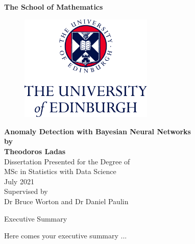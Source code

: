 \documentclass[11pt,twoside]{article}
\numberwithin{Theorem}{section}
\numberwithin{Definition}{section}
\numberwithin{Lemma}{section}
\numberwithin{Algorithm}{section}
\numberwithin{equation}{section}
\begin{document}
\pagestyle{empty}

\begin{titlepage}
\vspace*{.5em}
\center
\textbf{\Large{The School of Mathematics}} \\
\vspace*{1em}
\begin{figure}[!h]
\centering
\includegraphics[width=180pt]{CentredLogoCMYK.jpg}
\end{figure}
\vspace{2em}
\textbf{\Huge{Anomaly Detection with Bayesian Neural Networks}}\\[2em]
\textbf{\LARGE{by}}\\
\vspace{2em}
\textbf{\LARGE{Theodoros Ladas}}\\
\vspace{6.5em}
\Large{Dissertation Presented for the Degree of\\
MSc in Statistics with Data Science}\\
\vspace{6.5em}
\Large{July 2021}\\
\vspace{3em}
\Large{Supervised by\\Dr Bruce Worton and Dr Daniel Paulin}
\vfill
\end{titlepage}

\cleardoublepage

\begin{center}
\Large{Executive Summary}
\end{center}

Here comes your executive summary ...
\end{document}
